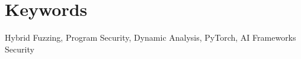 \documentclass[a4paper,14pt]{extarticle}
\begin{document}
\section*{Keywords}
Hybrid Fuzzing, Program Security, Dynamic Analysis, PyTorch, AI Frameworks Security
\pagebreak













\newpage

\printbibliography[heading=bibintoc]   %


\end{document}
